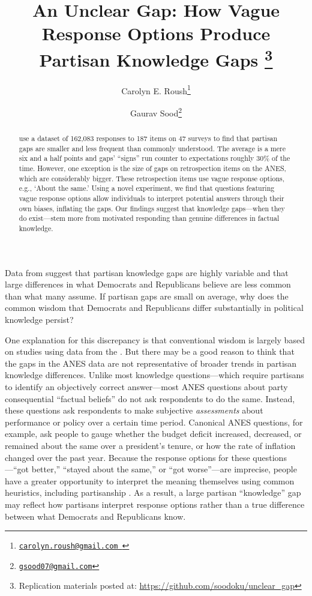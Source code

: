 \documentclass[12pt, letterpaper]{article}
\title{An Unclear Gap: How Vague Response Options Produce Partisan Knowledge Gaps \thanks{Replication materials posted at: \url{ https://github.com/soodoku/unclear_gap}}}
\author{Carolyn E. Roush\thanks{\href{mailto:carolyn.roush@gmail.com}{\texttt{carolyn.roush@gmail.com }}} \and Gaurav Sood\thanks{\href{mailto:gsood07@gmail.com}{\texttt{gsood07@gmail.com}}}}
\begin{document}
\maketitle
\thispagestyle{empty}

\begin{abstract}

\noindent \citet{roush_2021} use a dataset of 162,083 responses to 187 items on 47 surveys to find that partisan gaps are smaller and less frequent than commonly understood. The average is a mere six and a half points and gaps' ``signs'' run counter to expectations roughly 30\% of the time. However, one exception is the size of gaps on retrospection items on the ANES, which are considerably bigger. These retrospection items use vague response options, e.g., `About the same.' Using a novel experiment, we find that questions featuring vague response options allow individuals to interpret potential answers through their own biases, inflating the gaps. Our findings suggest that knowledge gaps---when they do exist---stem more from motivated responding than genuine differences in factual knowledge.
\end{abstract}

\vspace{.2in}

\newpage

\doublespacing
Data from \citet{roush_2021} suggest that partisan knowledge gaps are highly variable and that large differences in what Democrats and Republicans believe are less common than what many assume. If partisan gaps are small on average, why does the common wisdom that Democrats and Republicans differ substantially in political knowledge persist? 

One explanation for this discrepancy is that conventional wisdom is largely based on studies using data from the \citet{anes_gen}. But there may be a good reason to think that the gaps in the ANES data are not representative of broader trends in partisan knowledge differences. Unlike most knowledge questions---which require partisans to identify an objectively correct answer---most ANES questions about party consequential ``factual beliefs'' do not ask respondents to do the same. Instead, these questions ask respondents to make subjective \textit{assessments} about performance or policy over a certain time period. Canonical ANES questions, for example, ask people to gauge whether the budget deficit increased, decreased, or remained about the same over a president's tenure, or how the rate of inflation changed over the past year. Because the response options for these questions---``got better,'' ``stayed about the same,'' or ``got worse''---are imprecise, people have a greater opportunity to interpret the meaning themselves \citep[e.g.][]{beyth_1982} using common heuristics, including partisanship \citep[e.g.][]{soodguess_2017}. As a result, a large partisan ``knowledge'' gap may reflect how partisans interpret response options rather than a true difference between what Democrats and Republicans know.
\end{document}
